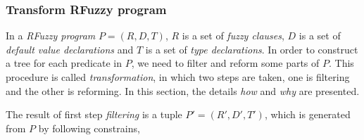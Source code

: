 \subsubsection{Transform RFuzzy program}
\label{sec:TransformRFuzzy}
In a \textit{RFuzzy program} $P=(R,D,T)$, $R$ is a set of \textit{fuzzy clauses}, $D$ is a set of \textit{default value declarations} and $T$ is a set of \textit{type declarations}. In order to construct a tree for each predicate in $P$, we need to filter and reform some parts of $P$. This procedure is called \textit{transformation}, in which two steps are taken, one is filtering and the other is reforming. In this section, the details \textit{how} and \textit{why} are presented. 

The result of first step \textit{filtering} is a tuple $P'=(R',D',T')$, which is generated from $P$ by following constrains,
